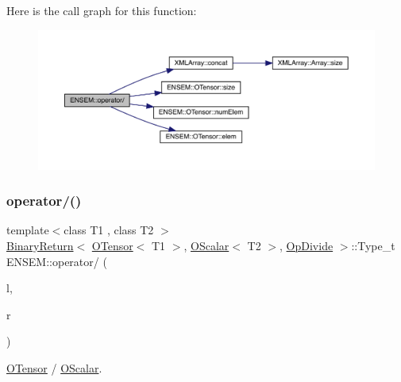 Here is the call graph for this function\+:\nopagebreak
\begin{figure}[H]
\begin{center}
\leavevmode
\includegraphics[width=350pt]{de/d87/group__obstensor_gab78687abe74ea9ae63cc1a98de644b13_cgraph}
\end{center}
\end{figure}
\mbox{\label{group__obstensor_ga5810ade8421abe1d7a6cf07748ac83d3}} 
\subsubsection{\texorpdfstring{operator/()}{operator/()}\hspace{0.1cm}{\footnotesize\ttfamily [2/3]}}
{\footnotesize\ttfamily template$<$class T1 , class T2 $>$ \\
\mbox{\hyperlink{structENSEM_1_1BinaryReturn}{Binary\+Return}}$<$ \mbox{\hyperlink{classENSEM_1_1OTensor}{O\+Tensor}}$<$ T1 $>$, \mbox{\hyperlink{classENSEM_1_1OScalar}{O\+Scalar}}$<$ T2 $>$, \mbox{\hyperlink{structENSEM_1_1OpDivide}{Op\+Divide}} $>$\+::Type\+\_\+t E\+N\+S\+E\+M\+::operator/ (\begin{DoxyParamCaption}\item[{const \mbox{\hyperlink{classENSEM_1_1OTensor}{O\+Tensor}}$<$ T1 $>$ \&}]{l,  }\item[{const \mbox{\hyperlink{classENSEM_1_1OScalar}{O\+Scalar}}$<$ T2 $>$ \&}]{r }\end{DoxyParamCaption})\hspace{0.3cm}{\ttfamily [inline]}}



\mbox{\hyperlink{classENSEM_1_1OTensor}{O\+Tensor}} / \mbox{\hyperlink{classENSEM_1_1OScalar}{O\+Scalar}}. 

